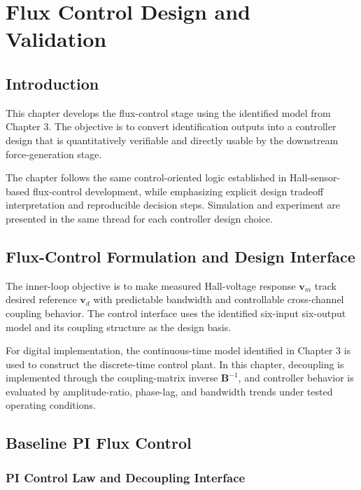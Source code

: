 \chapter{Flux Control Design and Validation}

\section{Introduction}

This chapter develops the flux-control stage using the identified model from Chapter 3. The objective is to convert identification outputs into a controller design that is quantitatively verifiable and directly usable by the downstream force-generation stage.

The chapter follows the same control-oriented logic established in Hall-sensor-based flux-control development, while emphasizing explicit design tradeoff interpretation and reproducible decision steps. Simulation and experiment are presented in the same thread for each controller design choice.

\section{Flux-Control Formulation and Design Interface}

The inner-loop objective is to make measured Hall-voltage response $\mathbf{v}_{m}$ track desired reference $\mathbf{v}_{d}$ with predictable bandwidth and controllable cross-channel coupling behavior. The control interface uses the identified six-input six-output model and its coupling structure as the design basis.

For digital implementation, the continuous-time model identified in Chapter 3 is used to construct the discrete-time control plant. In this chapter, decoupling is implemented through the coupling-matrix inverse $\mathbf{B}^{-1}$, and controller behavior is evaluated by amplitude-ratio, phase-lag, and bandwidth trends under tested operating conditions.

\section{Baseline PI Flux Control}

\subsection{PI Control Law and Decoupling Interface}

